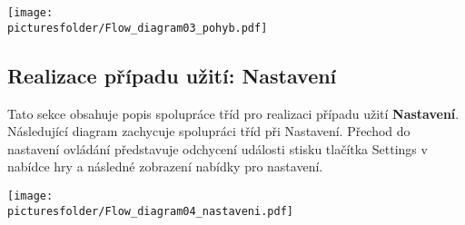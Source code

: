 \documentclass[12pt,a4paper]{article}
\def\picturesfolder{obrazky}
\begin{document}
\begin{center}
\texttt{[image: \\picturesfolder/Flow\_diagram03\_pohyb.pdf]}
\end{center}

\subsection{Realizace případu užití: Nastavení}

Tato sekce obsahuje popis spolupráce tříd pro realizaci případu užití
\textbf{Nastavení}.  Následující diagram zachycuje spolupráci tříd při
Nastavení. Přechod do nastavení ovládání představuje odchycení události stisku
tlačítka Settings v nabídce hry a následné zobrazení nabídky pro nastavení.

\begin{center}
\texttt{[image: \\picturesfolder/Flow\_diagram04\_nastaveni.pdf]}
\end{center}
\end{document}
